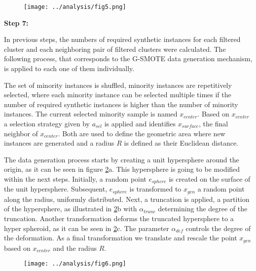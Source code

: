 \documentclass[parskip=full]{scrartcl}
\begin{document}
\begin{figure}[H]
	\centering
	\texttt{[image: ../analysis/fig5.png]}
	\label{fig:Somo_Overview}
\end{figure}

\textbf{Step 7:}

In previous steps, the numbers of required synthetic instances for each filtered cluster and each neighboring pair of filtered clusters were calculated. The following process, that corresponds to the G-SMOTE data generation mechanism, is applied to each one of them individually.

The set of minority instances is shuffled, minority instances are repetitively selected, where each minority instance can be selected multiple times if the number of required synthetic instances is higher than the number of minority instances. The current selected minority sample is named $x_{center}$. Based on $x_{center}$ a selection strategy given by $a_{sel}$ is applied and identifies $x_{surface}$, the final neighbor of $x_{center}$. Both are used to define the geometric area where new instances are generated and a radius $R$ is defined as their Euclidean distance.

The data generation process starts by creating a unit hypersphere around the origin, as it can be seen in figure \ref{fig:Hypersphere}a. This hypersphere is going to be modified within the next steps. Initially, a random point $e_{sphere}$ is created on the surface of the unit hypersphere. Subsequent, $e_{sphere}$ is transformed to $x_{gen}$ a random point along the radius, uniformly distributed. Next, a truncation is applied, a partition of the hypersphere, as illustrated in \ref{fig:Hypersphere}b with $\alpha_{trunc}$ determining the degree of the truncation. Another transformation deforms the truncated hypersphere to a hyper spheroid, as it can be seen in \ref{fig:Hypersphere}c. The parameter $\alpha_{def}$ controls the degree of the deformation.  As a final transformation we translate and rescale the point $x_{gen}$ based on $x_{center}$ and the radius $R$.

\begin{figure}[H]
	\centering
	\texttt{[image: ../analysis/fig6.png]}
	\label{fig:Hypersphere}
\end{figure}
\end{document}
